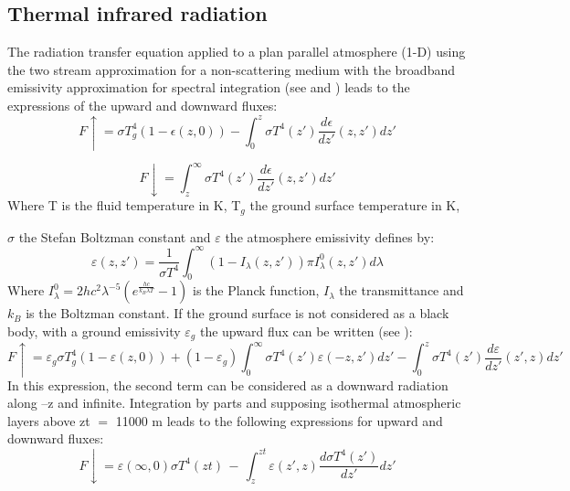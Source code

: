 \subsection{Thermal infrared radiation}
The radiation transfer equation applied to a plan parallel atmosphere (1-D)
using the two stream approximation for a non-scattering medium with the
broadband emissivity approximation for spectral integration (see \cite{Liou:2002}
and \cite{Makke:2016}) leads to the expressions of the upward
and downward fluxes:
\begin{equation}
F\uparrow =\sigma T_{g}^{4}\left( 1-\epsilon \left( z,0 \right)
\right)-\int_0^z \sigma T^{4}\left( z' \right)\frac{d\epsilon
}{dz'}\left( z,z' \right)dz'
\end{equation}

\begin{equation}
F\downarrow =\int_z^\infty \sigma T^{4}\left( z' \right)\frac{d\epsilon
}{dz'}\left( z,z' \right)dz'
\end{equation}
Where T is the fluid temperature in K, T$_{g}$ the ground surface temperature in K,

$\sigma $ the Stefan Boltzman constant and $\varepsilon$ the atmosphere
emissivity defines by:
\begin{equation}
\varepsilon \left( z,z' \right)
=\frac{1}{\sigma T^{4}}\int_0^\infty {\left(1-I_{\lambda}\left(z,z'
\right) \right)\pi I_{\lambda}^{0}} \left( z,z' \right)d\lambda
\end{equation}
\newline
Where
$I_{\lambda }^{0}=
{2hc^{2}\lambda^{-5}}
{(e^{\frac{{hc}}{k_{B}\lambda T}}-1)}$ is the Planck function,
\newline
$I_{\lambda}$ the transmittance and $k_{B}$ is the Boltzman constant.
\newline
\newline
If the ground surface is not considered as a black body, with a ground
emissivity $\varepsilon_{g}$ the upward flux can be written (see \cite{Ponnulakshmi:2012}):
\newline
\begin{equation}
F\uparrow =\varepsilon_{g}\sigma T_{g}^{4}\left( 1-\varepsilon \left( z,0
\right) \right)+\left( 1-\varepsilon_{g} \right)\int_0^\infty {\sigma
T^{4}} \left( z' \right)\varepsilon \left( -z,z' \right)dz'-\int_0^z
{\sigma T^{4}\left( z' \right)\frac{d\varepsilon }{dz'}\left(z',z
\right)dz'}
\end{equation}
\newline
In this expression, the second term can be considered as a downward
radiation along --z and infinite. Integration by parts and supposing
isothermal atmospheric layers above zt $=$ 11000 m leads to the following
expressions for upward and downward fluxes:
\newline
\begin{equation}
F\downarrow =\varepsilon \left( \infty ,0 \right)\sigma T^{4}\left( zt
\right)\, -\, \int_z^{zt} {\varepsilon (z',z)\frac{d \sigma
T^{4}(z')}{dz'}dz'}
\end{equation}


